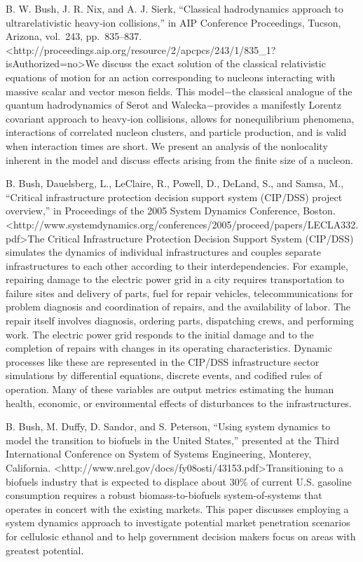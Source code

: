 \documentclass[]{article}
\begin{document}
B. W. Bush, J. R. Nix, and A. J. Sierk, ``Classical hadrodynamics
approach to ultrarelativistic heavy‐ion collisions,'' in AIP Conference
Proceedings, Tucson, Arizona, vol.~243, pp.~835--837.
\textless{}http://proceedings.aip.org/resource/2/apcpcs/243/1/835\_1?isAuthorized=no\textgreater{}We
discuss the exact solution of the classical relativistic equations of
motion for an action corresponding to nucleons interacting with massive
scalar and vector meson fields. This model−the classical analogue of the
quantum hadrodynamics of Serot and Walecka−provides a manifestly Lorentz
covariant approach to heavy‐ion collisions, allows for nonequilibrium
phenomena, interactions of correlated nucleon clusters, and particle
production, and is valid when interaction times are short. We present an
analysis of the nonlocality inherent in the model and discuss effects
arising from the finite size of a nucleon.

B. Bush, Dauelsberg, L., LeClaire, R., Powell, D., DeLand, S., and
Samsa, M., ``Critical infrastructure protection decision support system
(CIP/DSS) project overview,'' in Proceedings of the 2005 System Dynamics
Conference, Boston.
\textless{}http://www.systemdynamics.org/conferences/2005/proceed/papers/LECLA332.pdf\textgreater{}The
Critical Infrastructure Protection Decision Support System (CIP/DSS)
simulates the dynamics of individual infrastructures and couples
separate infrastructures to each other according to their
interdependencies. For example, repairing damage to the electric power
grid in a city requires transportation to failure sites and delivery of
parts, fuel for repair vehicles, telecommunications for problem
diagnosis and coordination of repairs, and the availability of labor.
The repair itself involves diagnosis, ordering parts, dispatching crews,
and performing work. The electric power grid responds to the initial
damage and to the completion of repairs with changes in its operating
characteristics. Dynamic processes like these are represented in the
CIP/DSS infrastructure sector simulations by differential equations,
discrete events, and codified rules of operation. Many of these
variables are output metrics estimating the human health, economic, or
environmental effects of disturbances to the infrastructures.

B. Bush, M. Duffy, D. Sandor, and S. Peterson, ``Using system dynamics
to model the transition to biofuels in the United States,'' presented at
the Third International Conference on System of Systems Engineering,
Monterey, California.
\textless{}http://www.nrel.gov/docs/fy08osti/43153.pdf\textgreater{}Transitioning
to a biofuels industry that is expected to displace about 30\% of
current U.S. gasoline consumption requires a robust biomass-to-biofuels
system-of-systems that operates in concert with the existing markets.
This paper discusses employing a system dynamics approach to investigate
potential market penetration scenarios for cellulosic ethanol and to
help government decision makers focus on areas with greatest potential.
\end{document}
